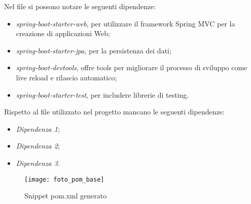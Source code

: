 \noindent Nel file si possono notare le seguenti dipendenze:
\begin{itemize}
\item \textit{spring-boot-starter-web}, per utilizzare il framework Spring MVC per la creazione di applicazioni Web;
\item \textit{spring-boot-starter-jpa}, per la persistenza dei dati;
\item \textit{spring-boot-devtools}, offre tools per migliorare il processo di sviluppo come live reload e rilascio automatico;
\item \textit{spring-boot-starter-test}, per includere librerie di testing.
\end{itemize}
Rispetto al file utilizzato nel progetto mancano le seguenti dipendenze:
\begin{itemize}
\item \textit{Dipendenza 1};
\item \textit{Dipendenza 2};
\item \textit{Dipendenza 3}.
\end{itemize}
\begin{figure}[H] 
    \centering 
    \texttt{[image: foto\_pom\_base]} 
    \caption{Snippet pom.xml generato}
\end{figure}
%
%
%

